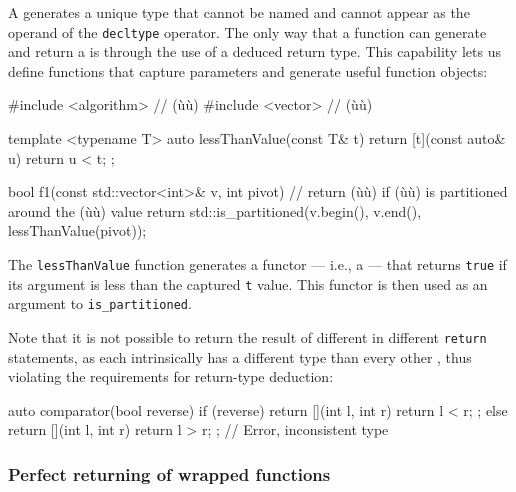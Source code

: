 A  generates a unique  type
that cannot be named and cannot appear as the operand of the
\lstinline!decltype! operator. The only way that a function can generate
and return a  is through the use of a deduced
return type. This capability lets us define functions that capture
parameters and generate useful function objects:

\begin{emcppslisting}
#include <algorithm>  // (ù{}ù)
#include <vector>     // (ù{}ù)

template <typename T>
auto lessThanValue(const T& t)
{
    return [t](const auto& u) { return u < t; };
}

bool f1(const std::vector<int>& v, int pivot)
    // return (ù{}ù) if (ù{}ù) is partitioned around the (ù{}ù) value
{
    return std::is_partitioned(v.begin(), v.end(), lessThanValue(pivot));
}
\end{emcppslisting}
    

\noindent The \lstinline!lessThanValue! function generates a functor --- i.e., a
 --- that returns \lstinline!true! if its argument
is less than the captured \lstinline!t! value. This functor is then used as
an argument to \lstinline!is_partitioned!.

Note that it is not possible to return the result of different
 in different \lstinline!return! statements, as
each  intrinsically has a different type than
every other , thus violating the requirements
for return-type deduction:

\begin{emcppslisting}
auto comparator(bool reverse)
{
    if (reverse)
    {
        return [](int l, int r) { return l < r; };
    }
    else
    {
        return [](int l, int r) { return l > r; };  // Error, inconsistent type
    }
}
\end{emcppslisting}
    

\subsubsection[Perfect returning of wrapped functions]{Perfect returning of wrapped functions}\label{perfect-returning-of-wrapped-functions}

